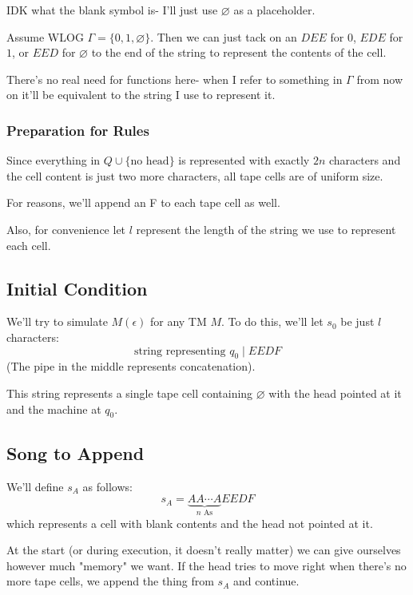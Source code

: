 \documentclass[12pt]{article}
\begin{document}
IDK what the blank symbol is- I'll just use $\varnothing$ as a placeholder.

Assume WLOG $\Gamma=\{0, 1, \varnothing\}$.
Then we can just tack on an $DEE$ for $0$, $EDE$ for $1$, or $EED$ for $\varnothing$
to the end of the string to represent the contents of the cell.

There's no real need for functions here- when I refer to something in $\Gamma$
from now on it'll be equivalent to the string I use to represent it.

\subsubsection{Preparation for Rules}

Since everything in $Q \cup \{\text{no head}\}$ is represented with exactly $2n$
characters and the cell content is just two more characters,
all tape cells are of uniform size.

For reasons, we'll append an F to each tape cell as well.

Also, for convenience let $l$ represent the length of the string
we use to represent each cell.

\pagebreak

\subsection{Initial Condition}

We'll try to simulate $M(\epsilon)$ for any TM $M$.
To do this, we'll let $s_0$ be just $l$ characters:
\[\text{string representing $q_0$} \mid EEDF\]
(The pipe in the middle represents concatenation).

This string represents a single tape cell containing $\varnothing$
with the head pointed at it and the machine at $q_0$.

\subsection{Song to Append}

We'll define $s_A$ as follows:
\[s_A=\underbrace{AA \cdots A}_{\text{$n$ As}}EEDF\]
which represents a cell with blank contents and the head not pointed at it.

At the start (or during execution, it doesn't really matter)
we can give ourselves however much "memory" we want.
If the head tries to move right when there's no more tape cells,
we append the thing from $s_A$ and continue.
\end{document}
